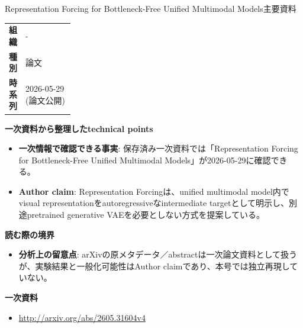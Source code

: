 \begin{technicalnote}{Representation Forcing for Bottleneck-Free Unified Multimodal Models}{主要資料}
\begingroup
\begin{tabularx}{\linewidth}{@{}>{\bfseries}p{0.22\linewidth}X@{}}
組織 & - \\
種別 & 論文 \\
時系列 & 2026-05-29 (論文公開) \\
\end{tabularx}
\smallskip
{\bfseries 一次資料から整理したtechnical points}
\begin{itemize}[leftmargin=1.5em,itemsep=0.35em]
\item \textbf{一次情報で確認できる事実}: 保存済み一次資料では「Representation Forcing for Bottleneck-Free Unified Multimodal Models」が2026-05-29に確認できる。
\item \textbf{Author claim}: Representation Forcingは、unified multimodal model内でvisual representationをautoregressiveなintermediate targetとして明示し、別途pretrained generative VAEを必要としない方式を提案している。
\end{itemize}
{\bfseries 読む際の境界}
\begin{itemize}[leftmargin=1.5em,itemsep=0.35em]
\item \textbf{分析上の留意点}: arXivの原メタデータ／abstractは一次論文資料として扱うが、実験結果と一般化可能性はAuthor claimであり、本号では独立再現していない。
\end{itemize}
\begin{samepage}
{\bfseries 一次資料}
\begingroup\sloppy
\begin{itemize}[leftmargin=1.5em,itemsep=0.25em]
\item {\scriptsize\url{http://arxiv.org/abs/2605.31604v4}}
\end{itemize}
\endgroup
\end{samepage}
\endgroup
\end{technicalnote}
\medskip
